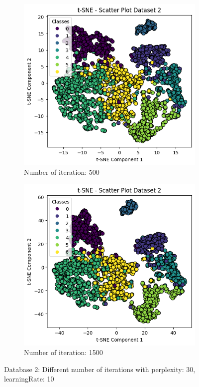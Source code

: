 \documentclass[12pt]{report}
\begin{document}
	\begin{figure}[H]
		\centering
		\begin{subfigure}{.5\textwidth}
			\centering
			\includegraphics[width=.8\linewidth]{../t-SNE/OutputPlot/Dataset2Outputplot/n_iter500.png}
			\caption{Number of iteration: 500}
			\label{Dataset2nr_iter500}
		\end{subfigure}%
		\begin{subfigure}{.5\textwidth}
			\centering
			\includegraphics[width=.8\linewidth]{../t-SNE/OutputPlot/Dataset2Outputplot/n_iter1500.png}
			\caption{Number of iteration: 1500}
			\label{Dataset2nr_iter1500}
		\end{subfigure}
		\caption{Database 2: Different number of iterations with perplexity: 30, learningRate: 10}
		\label{Dataset2Diffnr_iter}
	\end{figure}
\end{document}
